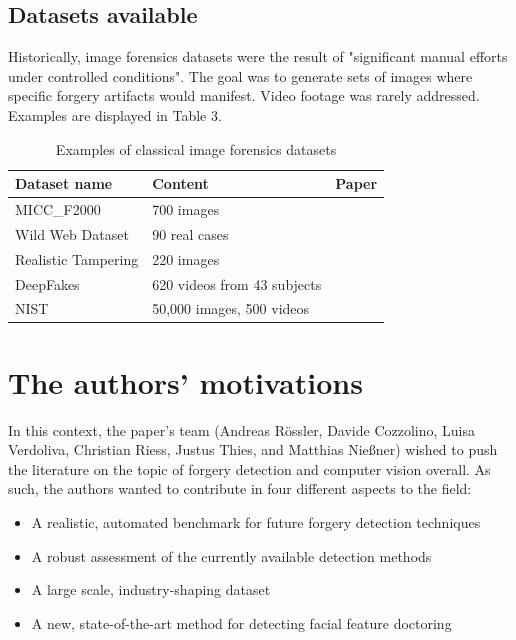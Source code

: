 \documentclass{article} %
\begin{document}
\subsection{Datasets available}

Historically, image forensics datasets were the result of "significant manual efforts under controlled conditions". The goal was to generate sets of images where specific forgery artifacts would manifest. Video footage was rarely addressed. Examples are displayed in Table 3.

\begin{table}[h!]
\centering
\begin{tabular}{ | p{4.5cm} | p{4.5cm} | p{4cm} |  }
 \hline
 \textbf{Dataset name} & \textbf{Content} & \textbf{Paper} \\
 \hline
 MICC\_F2000 & 700 images & \cite{5734842} \\
 Wild Web Dataset & 90 real cases & \cite{7169839} \\
 Realistic Tampering & 220 images & \cite{7776959} \\
 DeepFakes & 620 videos from 43 subjects & \cite{korshunov2018deepfakes} \\
 NIST & 50,000 images, 500 videos & \cite{8638296} \\
 \hline
\end{tabular}
\caption{Examples of classical image forensics datasets}
\end{table}

\section{The authors' motivations}

In this context, the paper's team (Andreas Rössler, Davide Cozzolino, Luisa Verdoliva, Christian Riess, Justus Thies, and Matthias Nießner) wished to push the literature on the topic of forgery detection and computer vision overall. As such, the authors wanted to contribute in four different aspects to the field:
\begin{itemize}
    \item A realistic, automated benchmark for future forgery detection techniques
    \item A robust assessment of the currently available detection methods
    \item A large scale, industry-shaping dataset
    \item A new, state-of-the-art method for detecting facial feature doctoring
\end{itemize}
\end{document}
